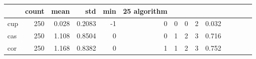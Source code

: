 \begin{tabular}{lrrrrrrrrr}
\toprule
 & count & mean & std & min & 25%
algorithm &  &  &  &  &  &  &  &  &  \\
\midrule
cup & 250 & 0.028 & 0.2083 & -1 & 0 & 0 & 0 & 2 & 0.032 \\
cas & 250 & 1.108 & 0.8504 & 0 & 0 & 1 & 2 & 3 & 0.716 \\
cor & 250 & 1.168 & 0.8382 & 0 & 1 & 1 & 2 & 3 & 0.752 \\
\bottomrule
\end{tabular}
